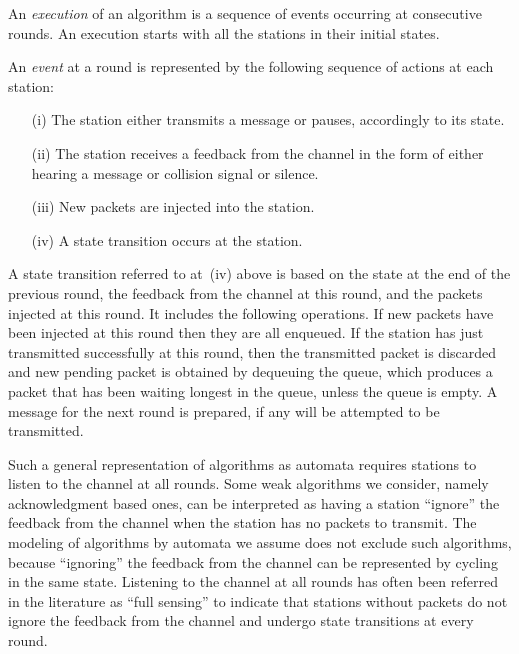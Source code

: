 \documentclass[11pt]{article}
\begin{document}
An \emph{execution} of an algorithm is a sequence of events occurring at consecutive rounds.
An execution starts with all the stations in their initial states.

An \emph{event} at a round is represented by the following sequence of actions at each station:
%
\begin{enumerate}

\item[(i)]  The station either transmits a message or pauses, accordingly to its state.

\item[(ii)] The station receives a feedback from the channel in the form of either hearing a message or collision signal or silence.

\item[(iii)]  New packets are injected into the station. 

\item[(iv)] 
A state transition occurs at the station.
\end{enumerate}

A state transition referred to at~(iv) above is based on the state at the end of the previous round, the feedback from the channel at this round, and the packets injected at this round.
It includes the following operations.
If new packets have been injected at this round then they are all enqueued.
If the station has just transmitted successfully at this round, then the transmitted packet is discarded and new pending packet is obtained by dequeuing the queue, which produces a packet that has been waiting longest in the queue, unless the queue is empty.
A message for the next round is prepared, if any will be attempted to be transmitted.

Such a general representation of algorithms as automata requires stations to listen to the channel at all rounds.
Some weak algorithms we consider, namely acknowledgment based ones, can be interpreted as having a station ``ignore'' the feedback from the channel when the station has no packets to transmit.
The modeling of algorithms by automata we assume does not exclude such algorithms, because ``ignoring'' the feedback from the channel can be represented by cycling in the same state.
Listening to the channel at all rounds has often been referred in the literature as ``full sensing'' to indicate that stations without packets do not ignore the feedback from the channel and undergo state transitions at every round.
\end{document}
